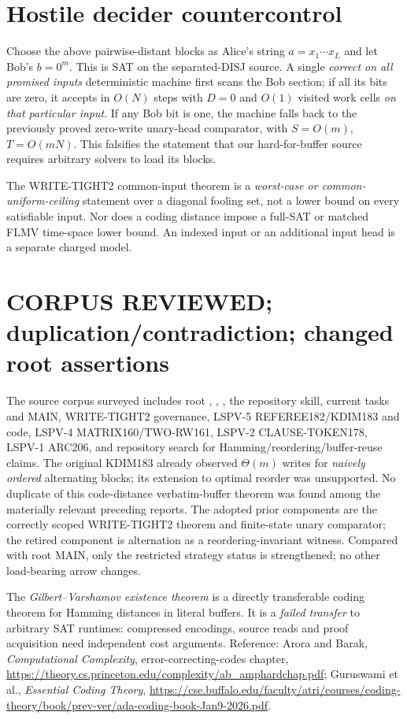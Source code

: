 \documentclass[11pt]{article}
\begin{document}
\section{Hostile decider countercontrol}
Choose the above pairwise-distant blocks as Alice's string \(a=x_1\cdots x_L\) and let Bob's \(b=0^m\). This is SAT on the separated-DISJ source. A single \emph{correct on all promised inputs} deterministic machine first scans the Bob section; if all its bits are zero, it accepts in \(O(N)\) steps with \(D=0\) and \(O(1)\) visited work cells \emph{on that particular input}. If any Bob bit is one, the machine falls back to the previously proved zero-write unary-head comparator, with \(S=O(m)\), \(T=O(mN)\). This falsifies the statement that our hard-for-buffer source requires arbitrary solvers to load its blocks.

The WRITE-TIGHT2 common-input theorem is a \emph{worst-case or common-uniform-ceiling} statement over a diagonal fooling set, not a lower bound on every satisfiable input. Nor does a coding distance impose a full-SAT or matched FLMV time-space lower bound. An indexed input or an additional input head is a separate charged model.

\section{CORPUS REVIEWED; duplication/contradiction; changed root assertions}
The source corpus surveyed includes root , , , the repository  skill, current tasks and MAIN, WRITE-TIGHT2 governance, LSPV-5 REFEREE182/KDIM183 and code, LSPV-4 MATRIX160/TWO-RW161, LSPV-2 CLAUSE-TOKEN178, LSPV-1 ARC206, and repository search for Hamming/reordering/buffer-reuse claims. The original KDIM183 already observed \(\Theta(m)\) writes for \emph{naively ordered} alternating blocks; its extension to optimal reorder was unsupported. No duplicate of this code-distance verbatim-buffer theorem was found among the materially relevant preceding reports. The adopted prior components are the correctly scoped WRITE-TIGHT2 theorem and finite-state unary comparator; the retired component is alternation as a reordering-invariant witness. Compared with root MAIN, only the restricted strategy status is strengthened; no other load-bearing arrow changes.

The \emph{Gilbert--Varshamov existence theorem} is a directly transferable coding theorem for Hamming distances in literal buffers. It is a \emph{failed transfer} to arbitrary SAT runtimes: compressed encodings, source reads and proof acquisition need independent cost arguments. Reference: Arora and Barak, \emph{Computational Complexity}, error-correcting-codes chapter, \url{https://theory.cs.princeton.edu/complexity/ab_amphardchap.pdf}; Guruswami et al., \emph{Essential Coding Theory}, \url{https://cse.buffalo.edu/faculty/atri/courses/coding-theory/book/prev-ver/ada-coding-book-Jan9-2026.pdf}.
\end{document}
